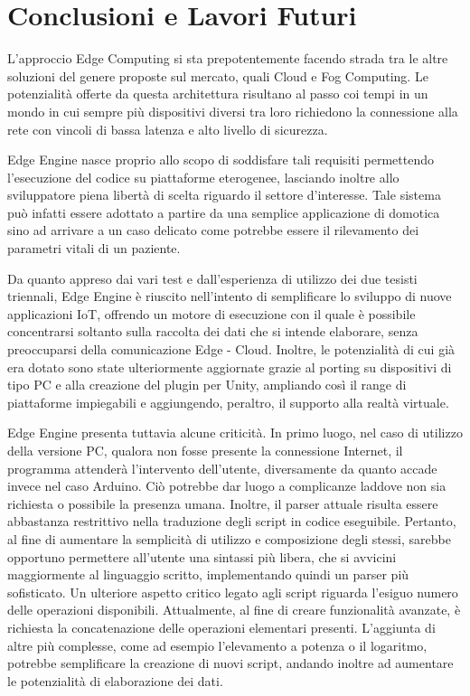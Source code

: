 \chapter{Conclusioni e Lavori Futuri}
L’approccio Edge Computing si sta prepotentemente facendo strada tra le altre soluzioni del genere proposte sul mercato, quali Cloud e Fog Computing. Le potenzialità offerte da questa architettura risultano al passo coi tempi in un mondo in cui sempre più dispositivi diversi tra loro richiedono la connessione alla rete con vincoli di bassa latenza e alto livello di sicurezza. 

Edge Engine nasce proprio allo scopo di soddisfare tali requisiti permettendo l’esecuzione del codice su piattaforme eterogenee, lasciando inoltre allo sviluppatore piena libertà di scelta riguardo il settore d’interesse. Tale sistema può infatti essere adottato a partire da una semplice applicazione di domotica sino ad arrivare a un caso delicato come potrebbe essere il rilevamento dei parametri vitali di un paziente.

Da quanto appreso dai vari test e dall'esperienza di utilizzo dei due tesisti triennali, Edge Engine è riuscito nell’intento di semplificare lo sviluppo di nuove applicazioni IoT, offrendo un motore di esecuzione con il quale è possibile concentrarsi soltanto sulla raccolta dei dati che si intende elaborare, senza preoccuparsi della comunicazione Edge - Cloud.  Inoltre, le potenzialità di cui già era dotato sono state ulteriormente aggiornate grazie al porting su dispositivi di tipo PC e alla creazione del plugin per Unity, ampliando così il range di piattaforme impiegabili e aggiungendo, peraltro, il supporto alla realtà virtuale.

Edge Engine presenta tuttavia alcune criticità. In primo luogo, nel caso di utilizzo della versione PC, qualora non fosse presente la connessione Internet, il programma attenderà l’intervento dell'utente, diversamente da quanto accade invece nel caso Arduino. Ciò potrebbe dar luogo a complicanze laddove non sia richiesta o possibile la presenza umana. Inoltre, il parser attuale risulta essere abbastanza restrittivo nella traduzione degli script in codice eseguibile. Pertanto, al fine di aumentare la semplicità di utilizzo e composizione degli stessi, sarebbe opportuno permettere all'utente una sintassi più libera, che si avvicini maggiormente al linguaggio scritto, implementando quindi un parser più sofisticato. Un ulteriore aspetto critico legato agli script riguarda l’esiguo numero delle operazioni disponibili. Attualmente, al fine di creare funzionalità avanzate, è richiesta la concatenazione delle operazioni elementari presenti. L’aggiunta di altre più complesse, come ad esempio l’elevamento a potenza o il logaritmo, potrebbe semplificare la creazione di nuovi script, andando inoltre ad aumentare le potenzialità di elaborazione dei dati.

